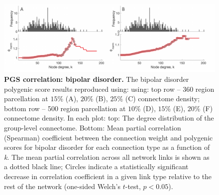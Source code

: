 \begin{figure}[h!]
\begin{center}
\includegraphics[width=1\textwidth]{Chapter5/SFigure5.pdf}%
\end{center}
\caption{\textbf{PGS correlation: bipolar disorder.}
The bipolar disorder polygenic score results reproduced using: using: top row -- 360 region parcellation at $15\%$ (A), $20\%$ (B), $25\%$ (C) connectome density; bottom row -- 500 region parcellation at $10\%$ (D), $15\%$ (E), $20\%$ (F) connectome density. In each plot: top: The degree distribution of the group-level connectome. Bottom: Mean partial correlation (Spearman) coefficient between the connection weight and polygenic scores for bipolar disorder for each connection type as a function of \textit{k}. The mean partial correlation across all network links is shown as a dotted black line; Circles indicate a statistically significant decrease in correlation coefficient in a given link type relative to the rest of the network (one-sided Welch's $t$-test, $p < 0.05$).}
\label{fig:Ch5SFig5}
\end{figure}


